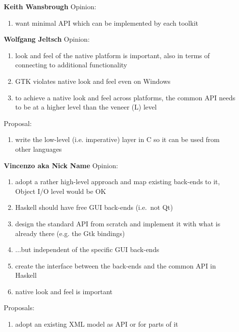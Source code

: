 \documentclass{article}
\newcommand{\Party}[1]{\stepcounter{enumi}\arabic{enumi} \bf #1}
\begin{document}
\begin{enumerate}
\item[\Party{Keith Wansbrough}] Opinion:
  \begin{enumerate}
  \item \label{interkw} want minimal API which can be implemented by
    each toolkit
  \end{enumerate}

\item[\Party{Wolfgang Jeltsch}] Opinion:
  \begin{enumerate}
  \item \label{lookwj} look and feel of the native platform is
    important, also in terms of connecting to additional functionality
  \item GTK violates native look and feel even on Windows %
  \item \label{lowwj} to achieve a native look and feel across
    platforms, the common API needs to be at a higher level than the
    veneer (L) level
  \end{enumerate}
  Proposal:
  \begin{enumerate}
  \item \label{langwj} write the low-level (i.e. imperative) layer in
    C so it can be used from other languages
  \end{enumerate}


\item[\Party{Vincenzo aka Nick Name}] Opinion:
  \begin{enumerate}
  \item \label{lowvnn} adopt a rather high-level approach and map existing back-ends
    to it, Object I/O level would be OK
  \item Haskell should have free GUI back-ends (i.e.~not Qt)
  \item \label{scratchvnn} design the standard API from scratch and
    implement it with what is already there (e.g. the Gtk bindings)
  \item ...but independent of the specific GUI back-ends
  \item create the interface between the back-ends and the common API
    in Haskell
  \item \label{lookwnn} native look and feel is important
  \end{enumerate}
  
  Proposals:
  \begin{enumerate}
  \item \label{docvnn} adopt an existing XML model as API or for parts
    of it
  \end{enumerate}


\end{enumerate}
\end{document}
